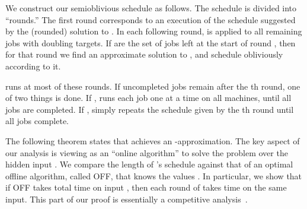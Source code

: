 We construct our semioblivious schedule \ALGsem as follows.  The
schedule is divided into ``rounds.''  The first round corresponds to
an execution of the schedule suggested by the (rounded) solution
to .  In each following round,  is
applied to all remaining jobs with doubling targets.  If  
 are the set of jobs left at
the start of round ,  then for that round we find an approximate solution 
to , and schedule obliviously according to it.

\ALGsem runs at most  of these
rounds. If uncompleted jobs remain after the th round,
one of two things is done.  If , \ALGsem runs each job one at a time
on all machines, until all jobs are completed. If , \ALGsem
simply repeats the schedule  given
by the th round until all jobs complete.

The following theorem states that \ALGsem achieves an -approximation.  The key aspect of our analysis is viewing
\ALGsem as an ``online algorithm'' to solve the \suureform problem
over the hidden input .
  We compare the length of \ALGsem's schedule against that of
an optimal offline algorithm, called OFF, that knows the values
.  In particular, we show that if OFF takes total time 
on input , then each round of \ALGsem takes time  on
the same input.  This part of our proof is essentially a competitive
analysis~\cite{SleatorTa85}.


